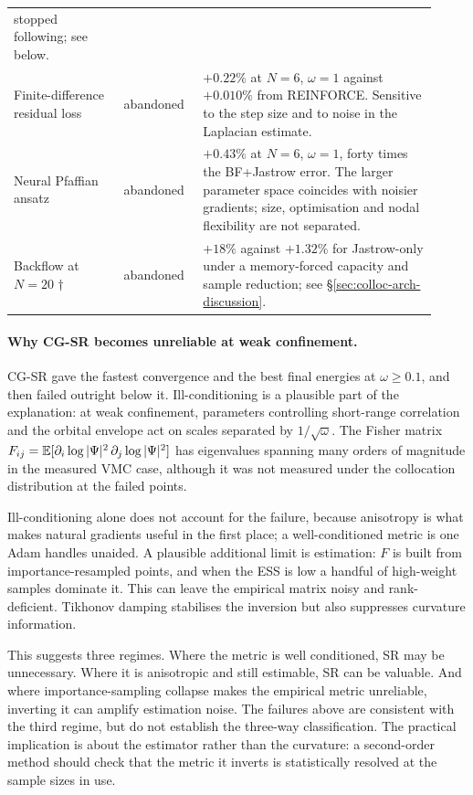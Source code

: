 \begin{table}[htbp]
\begin{tabular}{@{}p{0.24\linewidth} p{0.17\linewidth} p{0.51\linewidth}@{}}
    stopped following; see below. \\
Finite-difference residual loss
  & abandoned
  & $+0.22\%$ at $N{=}6$, $\omega{=}1$ against $+0.010\%$ from REINFORCE. Sensitive to
    the step size and to noise in the Laplacian estimate. \\
Neural Pfaffian ansatz~\cite{GaoGuennemann2024-NeuralPfaffian}
  & abandoned
  & $+0.43\%$ at $N{=}6$, $\omega{=}1$, forty times the BF+Jastrow error. The larger
    parameter space coincides with noisier gradients; size, optimisation and nodal
    flexibility are not separated. \\
Backflow at $N{=}20$ $\dagger$
  & abandoned
  & $+18\%$ against $+1.32\%$ for Jastrow-only under a memory-forced capacity and sample
    reduction; see \S\ref{sec:colloc-arch-discussion}. \\
\bottomrule
\end{tabular}
\end{table}

\paragraph{Why CG-SR becomes unreliable at weak confinement.}
CG-SR gave the fastest convergence and the best final energies at $\omega\ge0.1$, and
then failed outright below it. Ill-conditioning is a plausible part of the explanation: at
weak confinement, parameters controlling short-range correlation and the orbital envelope
act on scales separated by $1/\sqrt{\omega}$. The Fisher matrix
$F_{ij}=\mathbb{E}[\partial_i\log|\Psi|^2\,\partial_j\log|\Psi|^2]$ has eigenvalues spanning
many orders of magnitude in the measured VMC case, although it was not measured under the
collocation distribution at the failed points.

Ill-conditioning alone does not account for the failure, because anisotropy is what
makes natural gradients useful in the first place; a well-conditioned metric is one Adam
handles unaided. A plausible additional limit is estimation: $F$ is built from
importance-resampled points, and when the ESS is low a handful of high-weight samples
dominate it. This can leave the empirical matrix noisy and rank-deficient. Tikhonov damping
stabilises the inversion but also suppresses curvature information.

This suggests three regimes. Where the metric is well conditioned, SR may be unnecessary.
Where it is anisotropic and still estimable, SR can be valuable. And where
importance-sampling collapse makes the empirical metric unreliable, inverting it
can amplify estimation noise. The failures above are consistent with the third regime, but
do not establish the three-way classification. The practical implication is about the
estimator rather than the curvature: a second-order method should check that the metric it
inverts is statistically resolved at the sample sizes in use.

